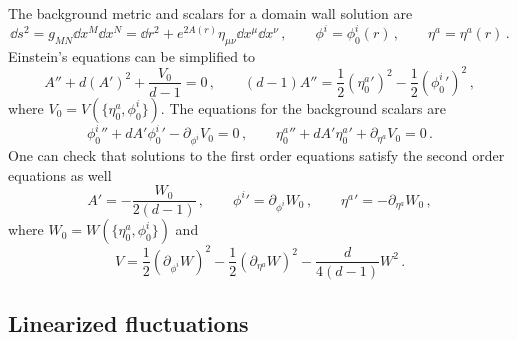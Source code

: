 The background metric and scalars for a domain wall solution are 
\begin{equation}
	\dd s^2=g_{MN}\dd x^M \dd x^N=\dd r^2+e^{2A(r)}\eta_{\mu\nu}\dd x^\mu \dd x^\nu
	\,,\qquad 
	\phi^i=\phi^i_0(r)
	\,,\qquad 
	\eta^a=\eta^a(r)\,.
\end{equation}
Einstein's equations can be simplified to
\begin{equation}\label{eq:Einsbackg}
	A''+d(A')^2+\frac{V_0}{d-1}=0
	\,,\qquad 
	(d-1)A''=\frac{1}{2}({\eta_0^a}')^2-\frac{1}{2}({\phi_0^i}')^2\,,
\end{equation}
where $V_0=V(\{\eta^a_0,\phi^i_0\})$.
The equations for the background scalars are
\begin{equation}\label{eq:scalarbackg}
	{\phi_0^i}''+dA'{\phi_0^i}'-\partial_{\phi^i}V_0=0
	\,,\qquad {\eta_0^a}''+dA'{\eta_0^a}'+\partial_{\eta^a}V_0=0\,.
\end{equation}
One can check that solutions to the first order equations satisfy the second order equations as well
\begin{equation}
   A'=-\frac{W_0}{2(d-1)}
   \,,\qquad {\phi^i}'=\partial_{\phi^i}W_0
   \,,\qquad
   {\eta^a}'=-\partial_{\eta^a}W_0\,,
\end{equation}
where $W_0=W(\{\eta^a_0,\phi^i_0\})$ and
\begin{equation}
	V=\frac{1}{2}(\partial_{\phi^i}W)^2-\frac{1}{2}(\partial_{\eta^a} W)^2-\frac{d}{4(d-1)}W^2\,.
\end{equation}

\subsection{Linearized fluctuations}


